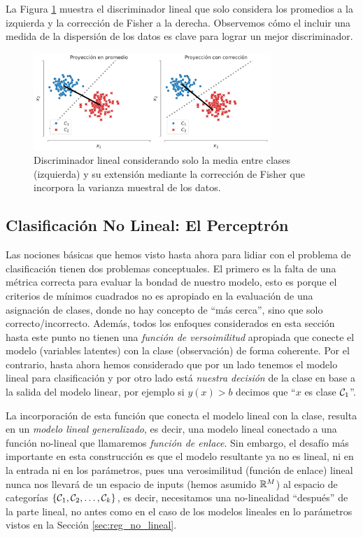 La Figura \ref{fig:ej_fda} muestra el  discriminador lineal que solo considera los promedios a la  izquierda y la corrección de Fisher a la derecha. Observemos cómo el incluir una medida de la dispersión de los datos es clave para lograr un mejor discriminador.

\begin{figure}[H]
	\centering
	\includegraphics[width=0.8\textwidth]{img/cap2_dos_clases_proyeccion.pdf}
	\caption{Discriminador lineal considerando solo la media entre clases (izquierda) y  su extensión mediante la corrección de Fisher que incorpora la varianza muestral de los datos.}
	\label{fig:ej_fda}
\end{figure}


\subsection{Clasificación No Lineal: El Perceptrón}

Las nociones básicas que hemos visto hasta ahora para lidiar con el problema de clasificación tienen dos problemas conceptuales. El primero es la falta de una métrica correcta para evaluar la bondad de nuestro modelo,  esto es porque el criterios de mínimos cuadrados no es apropiado en la evaluación de una asignación de clases, donde no hay concepto de ``más cerca'', sino que solo correcto/incorrecto. Además, todos los enfoques considerados en esta sección hasta este punto no tienen una \emph{función de versoimilitud} apropiada que conecte el modelo (variables latentes) con la clase (observación) de forma coherente. Por el contrario, hasta ahora hemos considerado que por un lado tenemos el modelo lineal para clasificación y por otro lado está \emph{nuestra decisión} de la clase en base a la salida del modelo linear, por  ejemplo si $y(x)>b$ decimos que ``$x$ es clase ${\mathcal C}_1$''.

La incorporación de esta función que conecta el modelo lineal con la clase, resulta en un \emph{modelo lineal generalizado}, es decir, una modelo lineal conectado a una  función no-lineal que llamaremos \emph{función de enlace}. Sin embargo, el desafío más importante en esta construcción es que el modelo resultante ya no es lineal, ni en la entrada ni en los parámetros, pues una verosimilitud (función de enlace) lineal nunca nos llevará de un espacio de inputs (hemos asumido ${\mathbb R}^M$) al espacio de categorías $\{{\mathcal C}_1,{\mathcal C}_2,\ldots,{\mathcal C}_k\}$, es decir, necesitamos una no-linealidad ``después'' de la parte lineal, no antes como en el caso de los modelos lineales en lo parámetros vistos en la Sección \ref{sec:reg_no_lineal}.

